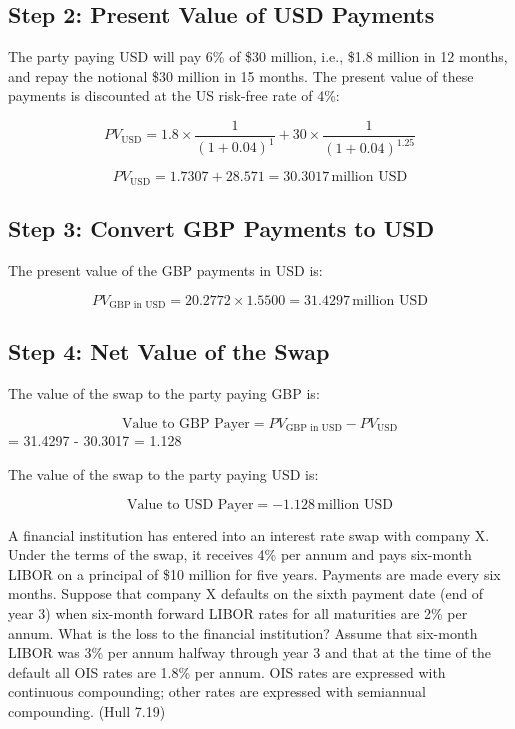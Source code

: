 \documentclass[12pt,letterpaper, onecolumn]{exam}
\begin{document}
\begin{questions}
\begin{solution}
\subsection*{Step 2: Present Value of USD Payments}

The party paying USD will pay 6\% of \$30 million, i.e., \$1.8 million in 12 months, and repay the notional \$30 million in 15 months. The present value of these payments is discounted at the US risk-free rate of 4\%:

\[
PV_{\text{USD}} = 1.8 \times \frac{1}{(1 + 0.04)^1} + 30 \times \frac{1}{(1 + 0.04)^{1.25}}
\]

\[
PV_{\text{USD}} = 1.7307 + 28.571 = 30.3017 \, \text{million USD}
\]

\subsection*{Step 3: Convert GBP Payments to USD}

The present value of the GBP payments in USD is:

\[
PV_{\text{GBP in USD}} = 20.2772 \times 1.5500 = 31.4297 \, \text{million USD}
\]

\subsection*{Step 4: Net Value of the Swap}

The value of the swap to the party paying GBP is:

\[
\text{Value to GBP Payer} = PV_{\text{GBP in USD}} - PV_{\text{USD}}
\]
= 31.4297 - 30.3017 = 1.128 \, 


The value of the swap to the party paying USD is:

\[
\text{Value to USD Payer} = -1.128 \, \text{million USD}
\]


\end{solution}


    \pagebreak %
    
    \question A financial institution has entered into an interest rate swap with company X. Under
the terms of the swap, it receives 4\% per annum and pays six-month LIBOR on a
principal of \$10 million for five years. Payments are made every six months. Suppose
that company X defaults on the sixth payment date (end of year 3) when six-month
forward LIBOR rates for all maturities are 2\% per annum. What is the loss to the
financial institution? Assume that six-month LIBOR was 3\% per annum halfway through
year 3 and that at the time of the default all OIS rates are 1.8\% per annum. OIS rates are
expressed with continuous compounding; other rates are expressed with semiannual
compounding. (Hull 7.19)


\end{questions}
\end{document}
